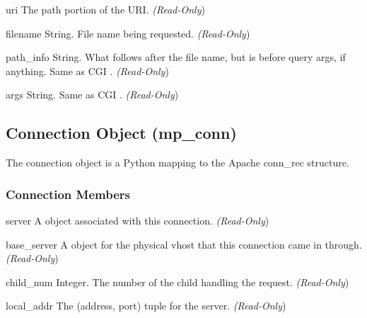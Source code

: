 \begin{memberdesc}[Request]{uri}
The path portion of the URI.
\emph{(Read-Only})
\end{memberdesc}

\begin{memberdesc}[Request]{filename}
String. File name being requested.
\emph{(Read-Only})
\end{memberdesc}

\begin{memberdesc}[Request]{path_info}
String. What follows after the file name, but is before query args, if
anything. Same as CGI .
\emph{(Read-Only})
\end{memberdesc}

\begin{memberdesc}[Request]{args}
String. Same as CGI .
\emph{(Read-Only})
\end{memberdesc}

\subsection{Connection Object (mp_conn)\label{pyapi-mpconn}}

The connection object is a Python mapping to the Apache conn_rec
structure.

\subsubsection{Connection Members\label{pyapi-mpconn-mem}}

\begin{memberdesc}[connection]{server}
A  object associated with this connection.
\emph{(Read-Only})
\end{memberdesc}

\begin{memberdesc}[connection]{base_server}
A  object for the physical vhost that this connection came in
through.
\emph{(Read-Only})
\end{memberdesc}

\begin{memberdesc}[connection]{child_num}
Integer. The number of the child handling the request.
\emph{(Read-Only})
\end{memberdesc}

\begin{memberdesc}[connection]{local_addr}
The (address, port) tuple for the server.
\emph{(Read-Only})
\end{memberdesc}

